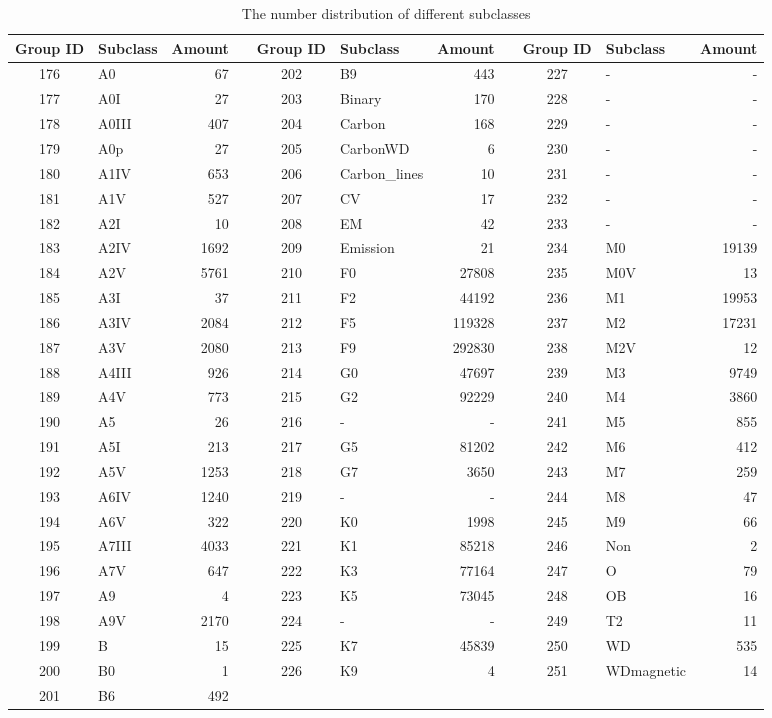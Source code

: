 \documentclass[referee]{raa}            %
\begin{document}


\begin{table}
\bc
\begin{minipage}[]{100mm}
\caption[]{The number distribution of different subclasses\label{tab1}}\end{minipage}
\setlength{\tabcolsep}{1pt}
\small
 \begin{tabular}{clr|lclr|lclr}
  \hline\hline
Group ID&Subclass&Amount&&Group ID&Subclass&Amount&&Group ID&Subclass&Amount\\
  \hline
176&A0&67&&202&B9&443&&227&-&-\\
177&A0I&27&&203&Binary&170&&228&-&-\\
178&A0III&407&&204&Carbon&168&&229&-&-\\
179&A0p&27&&205&CarbonWD&6&&230&-&-\\
180&A1IV&653&&206&Carbon\_lines&10&&231&-&-\\
181&A1V&527&&207&CV&17&&232&-&-\\
182&A2I&10&&208&EM&42&&233&-&-\\
183&A2IV&1692&&209&Emission&21&&234&M0&19139\\
184&A2V&5761&&210&F0&27808&&235&M0V&13\\
185&A3I&37&&211&F2&44192&&236&M1&19953\\
186&A3IV&2084&&212&F5&119328&&237&M2&17231\\
187&A3V&2080&&213&F9&292830&&238&M2V&12\\
188&A4III&926&&214&G0&47697&&239&M3&9749\\
189&A4V&773&&215&G2&92229&&240&M4&3860\\
190&A5&26&&216&-&-&&241&M5&855\\
191&A5I&213&&217&G5&81202&&242&M6&412\\
192&A5V&1253&&218&G7&3650&&243&M7&259\\
193&A6IV&1240&&219&-&-&&244&M8&47\\
194&A6V&322&&220&K0&1998&&245&M9&66\\
195&A7III&4033&&221&K1&85218&&246&Non&2\\
196&A7V&647&&222&K3&77164&&247&O&79\\
197&A9&4&&223&K5&73045&&248&OB&16\\
198&A9V&2170&&224&-&-&&249&T2&11\\
199&B&15&&225&K7&45839&&250&WD&535\\
200&B0&1&&226&K9&4&&251&WDmagnetic&14\\
201&B6&492&&&&&&&&\\

 \hline\hline
\end{tabular}
\ec
\end{table}
\end{document}
